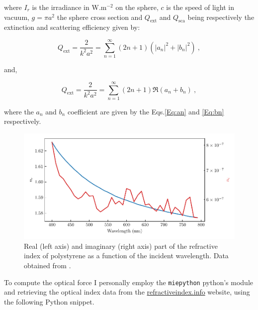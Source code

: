 where $I_r$ is the irradiance in $\mathrm{W.m^{-2}}$ on the sphere,  $c$ is the speed of light in vacuum, $g=\pi a^2$ the sphere cross section and  $Q_\mathrm{ext}$ and $Q_\mathrm{sca}$ being respectively the extinction and scattering efficiency given by:

\begin{equation}
	Q_\mathrm{ext} = \frac{2}{k^2 a^2} = \sum _{n=1} ^\infty (2n + 1 ) (|a_n|^2 + |b_n|^2) ~,
\end{equation}

and,

\begin{equation}
	Q_\mathrm{ext} = \frac{2}{k^2 a^2} = \sum _{n=1} ^\infty (2n + 1 ) \Re (a_n + b_n) ~,
\end{equation}

where the $a_n$ and $b_n$ coefficient are given by the Eqs.\ref{Eq:an} and \ref{Eq:bn} respectively.


\begin{figure}[H]
	\centering
	\includegraphics[scale=0.9]{02_body/chapter2/images/Calcul_force_optique/refractive_index.pdf}
	\caption{Real (left axis) and imaginary (right axis) part of the refractive index of polystyrene as a function of the incident wavelength. Data obtained from \cite{zhang_complex_2020}.  \href{https://github.com/eXpensia/Confined-Brownian-Motion/blob/main/02_body/chapter2/images/Calcul_force_optique/Calcul\%20optical\%20force.ipynb}{\faGithub}}
	\label{fig:refractive_index}
\end{figure}

To compute the optical force I personally employ the \texttt{miepython} python's module \href{https://github.com/scottprahl/miepython/}{\faGithub} and retrieving the optical index data from the \href{https://refractiveindex.info/?shelf=organic&book=polystyren&page=Zhang}{refractiveindex.info} website, using the following Python snippet.

